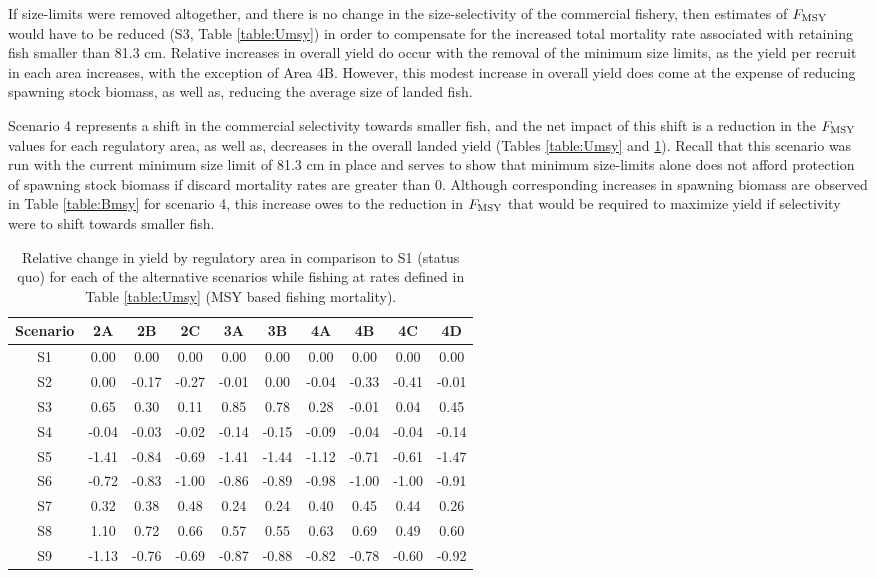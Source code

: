 If size-limits were removed altogether, and there is no change in the size-selectivity of the commercial fishery, then estimates of $F_{\rm{MSY}}$ would have to be reduced (S3, Table \ref{table:Umsy}) in order to compensate for the increased total mortality rate associated with retaining fish smaller than 81.3 cm.  Relative increases in overall yield do occur with the removal of the minimum size limits, as the yield per recruit in each area increases, with the exception of Area 4B.  However, this modest increase in overall yield does come at the expense of reducing spawning stock biomass, as well as, reducing the average size of landed fish.

Scenario 4 represents a shift in the commercial selectivity towards smaller fish, and the net impact of this shift is a reduction in the $F_{\rm{MSY}}$ values for each regulatory area, as well as, decreases in the overall landed yield (Tables \ref{table:Umsy} and \ref{table:MSY}).  Recall that this scenario was run with the current minimum size limit of 81.3 cm in place and serves to show that minimum size-limits alone does not afford protection of spawning stock biomass if discard mortality rates are greater than 0.  Although corresponding increases in spawning biomass are observed in Table \ref{table:Bmsy} for scenario 4, this increase owes to the reduction in $F_{\rm{MSY}}$ that would be required to maximize yield if selectivity were to shift towards smaller fish.

\begin{table}
	\caption{Relative change in yield by regulatory area in comparison to S1 (status quo) for each of the alternative scenarios while fishing at rates defined in Table \ref{table:Umsy} (MSY based fishing mortality).}
	\label{table:MSY}
	\begin{center}
		\begin{tabular}{c|ccccccccc}
		\hline
		Scenario & 2A & 2B & 2C & 3A & 3B & 4A & 4B & 4C & 4D\\
		\hline
		S1&  0.00&  0.00&  0.00&  0.00&  0.00&  0.00&  0.00&  0.00&  0.00 \\
		S2&  0.00& -0.17& -0.27& -0.01&  0.00& -0.04& -0.33& -0.41& -0.01 \\
		S3&  0.65&  0.30&  0.11&  0.85&  0.78&  0.28& -0.01&  0.04&  0.45 \\
		S4& -0.04& -0.03& -0.02& -0.14& -0.15& -0.09& -0.04& -0.04& -0.14 \\
		S5& -1.41& -0.84& -0.69& -1.41& -1.44& -1.12& -0.71& -0.61& -1.47 \\
		S6& -0.72& -0.83& -1.00& -0.86& -0.89& -0.98& -1.00& -1.00& -0.91 \\
		S7&  0.32&  0.38&  0.48&  0.24&  0.24&  0.40&  0.45&  0.44&  0.26 \\
		S8&  1.10&  0.72&  0.66&  0.57&  0.55&  0.63&  0.69&  0.49&  0.60 \\
		S9& -1.13& -0.76& -0.69& -0.87& -0.88& -0.82& -0.78& -0.60& -0.92 \\
		\hline
		\end{tabular}
	\end{center}
\end{table}

